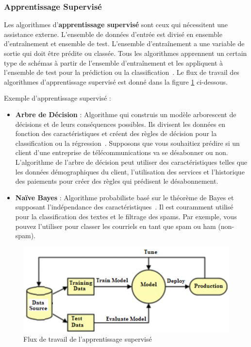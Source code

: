 \subsubsection{Apprentissage Supervisé}
Les algorithmes d'\textbf{apprentissage supervisé} sont ceux qui nécessitent une assistance externe. L'ensemble de données d'entrée est divisé en ensemble d'entraînement et ensemble de test. L'ensemble d'entraînement a une variable de sortie qui doit être prédite ou classée. Tous les algorithmes apprennent un certain type de schémas à partir de l'ensemble d'entraînement et les appliquent à l'ensemble de test pour la prédiction ou la classification~\cite{Machine2020Batta}. Le flux de travail des algorithmes d'apprentissage supervisé est donné dans la figure \ref{fig:suppervisedlearning} ci-dessous.

Exemple d'apprentissage supervisé :
\begin{itemize}
	\item \textbf{Arbre de Décision} : Algorithme qui construis un modèle arborescent de décisions et de leurs conséquences possibles. Ils divisent les données en fonction des caractéristiques et créent des règles de décision pour la classification ou la régression~\cite{leewayhertzSupervised}. Supposons que vous souhaitiez prédire si un client d'une entreprise de télécommunications va se désabonner ou non. L'algorithme de l'arbre de décision peut utiliser des caractéristiques telles que les données démographiques du client, l'utilisation des services et l'historique des paiements pour créer des règles qui prédisent le désabonnement.
	\item \textbf{Naïve Bayes} : Algorithme probabiliste basé sur le théorème de Bayes et supposant l'indépendance des caractéristiques~\cite{leewayhertzSupervised}. Il est couramment utilisé pour la classification des textes et le filtrage des spams. Par exemple, vous pouvez l'utiliser pour classer les courriels en tant que spam ou ham (non-spam).
\end{itemize}
\begin{figure}[!h]
	\centering
	\includegraphics[width=0.9\linewidth]{images/supervisedlearning}
	\caption{Flux de travail de l'apprentissage supervisé~\cite{supervised_learning}}
	\label{fig:suppervisedlearning}
\end{figure}
\newpage

